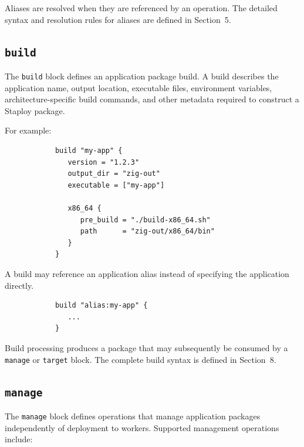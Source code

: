 \documentclass[11pt,a4paper]{article}
\begin{document}
    Aliases are resolved when they are referenced by an operation.
    The detailed syntax and resolution rules for aliases are defined in Section~5.

    \subsection{\texttt{build}}\label{subsec:texttt{build}}

    The \texttt{build} block defines an application package build.
    A build describes the application name, output location, executable
    files, environment variables, architecture-specific build commands,
    and other metadata required to construct a Staploy package.

    For example:

    \begin{center}
        \begin{verbatim}
            build "my-app" {
               version = "1.2.3"
               output_dir = "zig-out"
               executable = ["my-app"]

               x86_64 {
                  pre_build = "./build-x86_64.sh"
                  path      = "zig-out/x86_64/bin"
               }
            }
        \end{verbatim}
    \end{center}

    A build may reference an application alias instead of specifying the
    application directly.

    \begin{center}
        \begin{verbatim}
            build "alias:my-app" {
               ...
            }
        \end{verbatim}
    \end{center}

    Build processing produces a package that may subsequently be consumed by a \texttt{manage} or \texttt{target} block.
    The complete build syntax is defined in Section~8.

    \subsection{\texttt{manage}}\label{subsec:texttt{manage}}

    The \texttt{manage} block defines operations that manage application
    packages independently of deployment to workers.
    Supported management operations include:
\end{document}
